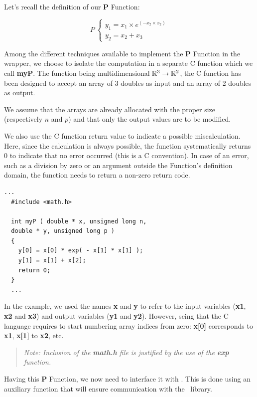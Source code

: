 Let's recall the definition of our {\bf P} Function:

$$P\:\left\{\begin{array}{l}
    y_1 = x_1 \times e^{(- x_2 \times x_2)} \\
    y_2 = x_2 + x_3
  \end{array}\right.$$

Among the different techniques available to implement the {\bf P} Function in the wrapper, we choose to isolate the computation in a separate C function which we call {\bf myP}. The function being multidimensional $\mathbb{R}^{3} \to \mathbb{R}^{2}$, the C function has been designed to accept an array of 3 doubles as input and an array of 2 doubles as output.

We assume that the arrays are already allocated with the proper size (respectively $n$ and $p$) and that only the output values are to be modified.

We also use the C function return value to indicate a possible miscalculation. Here, since the calculation is always possible, the function systematically returns 0 to indicate that no error occurred (this is a C convention). In case of an error, such as a division by zero or an argument outside the Function's definition domain, the function needs to return a non-zero return code.

\lstset{language=C, basicstyle=\normalsize}
\begin{lstlisting}[frame=TBRL]
  ...
  #include <math.h>

  int myP ( double * x, unsigned long n,
  double * y, unsigned long p )
  {
    y[0] = x[0] * exp( - x[1] * x[1] );
    y[1] = x[1] + x[2];
    return 0;
  }
  ...
\end{lstlisting}

In the example, we used the names {\bf x} and {\bf y} to refer to the input variables ({\bf x1}, {\bf x2} and {\bf x3}) and output variables ({\bf y1} and {\bf y2}). However, seing that the C language requires to start numbering array indices from zero: {\bf x[0]} corresponds to {\bf x1}, {\bf x[1]} to {\bf x2}, etc.

\small
\begin{quote}
  \textit{Note: Inclusion of the {\bf math.h} file is justified by the use of the {\bf exp} function.}
\end{quote}
\normalsize

Having this {\bf P} Function, we now need to interface it with \OT. This is done using an auxiliary function that will ensure communication with the \OT\ library.

